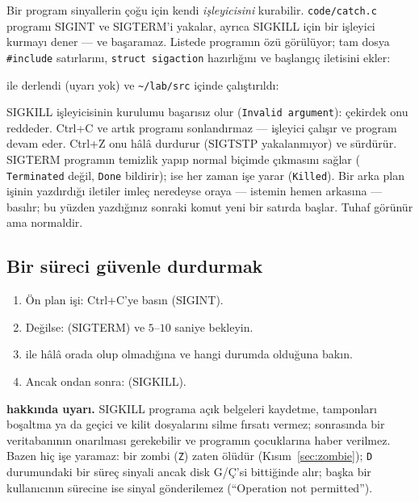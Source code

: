 Bir program sinyallerin çoğu için kendi \emph{işleyicisini} kurabilir. \texttt{code/catch.c} programı SIGINT ve SIGTERM'i yakalar, ayrıca SIGKILL için bir işleyici kurmayı dener --- ve başaramaz. Listede programın özü görülüyor; tam dosya \texttt{\#include} satırlarını, \texttt{struct sigaction} hazırlığını ve başlangıç iletisini ekler:



 ile derlendi (uyarı yok) ve \texttt{\textasciitilde/lab/src} içinde çalıştırıldı:



SIGKILL işleyicisinin kurulumu başarısız olur (\texttt{Invalid argument}): çekirdek onu reddeder. Ctrl+C ve  artık programı sonlandırmaz --- işleyici çalışır ve program devam eder. Ctrl+Z onu hâlâ durdurur (SIGTSTP yakalanmıyor) ve  sürdürür. SIGTERM programın temizlik yapıp normal biçimde çıkmasını sağlar ( \texttt{Terminated} değil, \texttt{Done} bildirir);  ise her zaman işe yarar (\texttt{Killed}).
Bir arka plan işinin yazdırdığı iletiler imleç neredeyse oraya --- istemin hemen arkasına --- basılır; bu yüzden yazdığınız sonraki komut yeni bir satırda başlar. Tuhaf görünür ama normaldir.

\subsection{Bir süreci güvenle durdurmak}

\begin{keyidea}
\begin{enumerate}[leftmargin=1.4em]
  \item Ön plan işi: Ctrl+C'ye basın (SIGINT).
  \item Değilse:  (SIGTERM) ve $5$--$10$ saniye bekleyin.
  \item {} ile hâlâ orada olup olmadığına ve hangi durumda olduğuna bakın.
  \item Ancak ondan sonra:  (SIGKILL).
\end{enumerate}
\end{keyidea}

\textbf{ hakkında uyarı.} SIGKILL programa açık belgeleri kaydetme, tamponları boşaltma ya da geçici ve kilit dosyalarını silme fırsatı vermez; sonrasında bir veritabanının onarılması gerekebilir ve programın çocuklarına haber verilmez. Bazen  hiç işe yaramaz: bir zombi (\texttt{Z}) zaten ölüdür (Kısım~\ref{sec:zombie}); \texttt{D} durumundaki bir süreç sinyali ancak disk G/Ç'si bittiğinde alır; başka bir kullanıcının sürecine ise sinyal gönderilemez (``Operation not permitted'').

